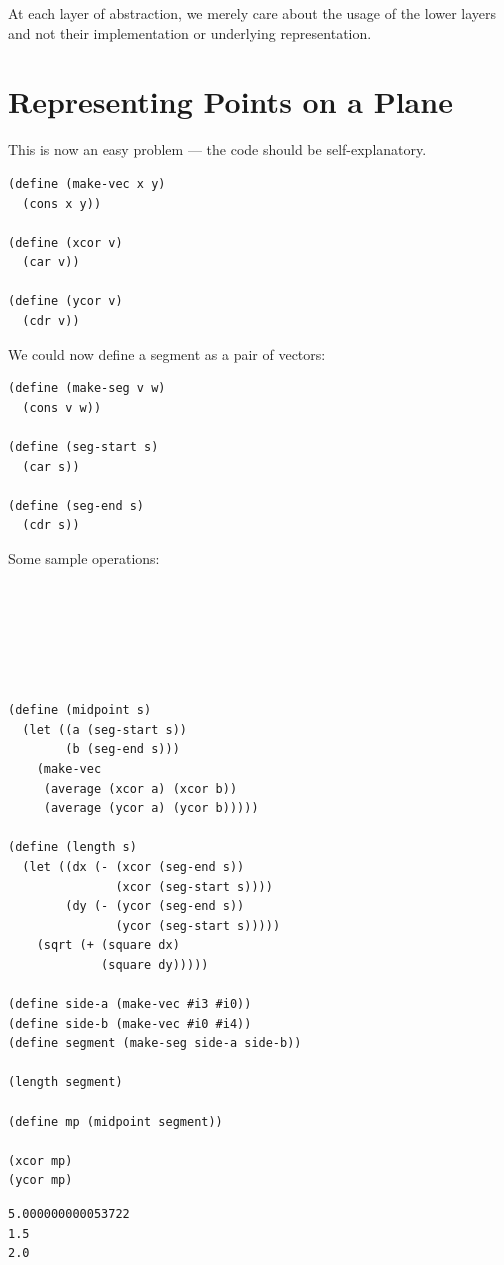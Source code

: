 \documentclass[9pt]{report}
\begin{document}
At each layer of abstraction, we merely care about the usage of
the lower layers and not their implementation or underlying
representation.

\section{Representing Points on a Plane}
\label{sec:org0170c14}

This is now an easy problem --- the code should be
self-explanatory.

\begin{verbatim}
(define (make-vec x y)
  (cons x y))

(define (xcor v)
  (car v))

(define (ycor v)
  (cdr v))
\end{verbatim}

We could now define a segment as a pair of vectors:

\begin{verbatim}
(define (make-seg v w)
  (cons v w))

(define (seg-start s)
  (car s))

(define (seg-end s)
  (cdr s))
\end{verbatim}

Some sample operations:

\begin{verbatim}






(define (midpoint s)
  (let ((a (seg-start s))
        (b (seg-end s)))
    (make-vec
     (average (xcor a) (xcor b))
     (average (ycor a) (ycor b)))))

(define (length s)
  (let ((dx (- (xcor (seg-end s))
               (xcor (seg-start s))))
        (dy (- (ycor (seg-end s))
               (ycor (seg-start s)))))
    (sqrt (+ (square dx)
             (square dy)))))

(define side-a (make-vec #i3 #i0))
(define side-b (make-vec #i0 #i4))
(define segment (make-seg side-a side-b))

(length segment)

(define mp (midpoint segment))

(xcor mp)
(ycor mp)
\end{verbatim}

\begin{verbatim}
5.000000000053722
1.5
2.0
\end{verbatim}
\end{document}
